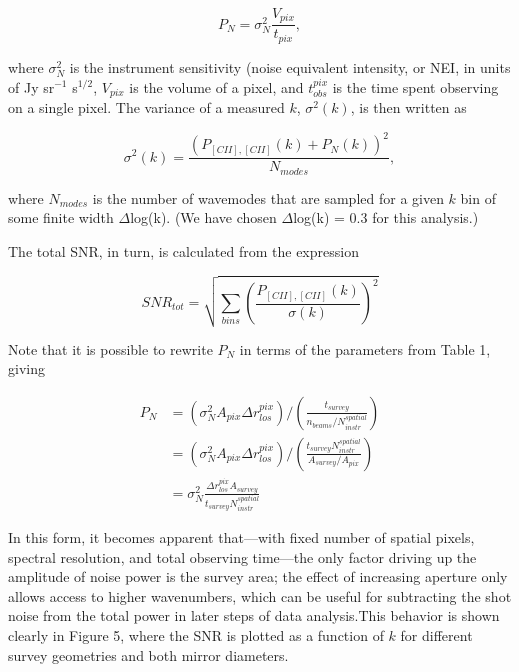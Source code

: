 \documentclass[12pt,preprint]{emulateapj}
\begin{document}
\begin{equation}
P_N = \sigma_N^2 \frac{V_{pix}}{t_{pix}},
\end{equation}

where $\sigma_N^2$ is the instrument sensitivity (noise equivalent intensity, or NEI, in units of Jy sr$^{-1}$ s$^{1/2}$, $V_{pix}$ is the volume of a pixel, and $t_{obs}^{pix}$ is the time spent observing on a single pixel. The variance of a measured $k$, $\sigma^2(k)$, is then written as

\begin{equation}
\sigma^2(k) = \frac{\left({P_{[CII],[CII]}(k) + P_N(k)}\right)^{2}}{N_{modes}},
\end{equation}

where $N_{modes}$ is the number of wavemodes that are sampled for a given $k$ bin of some finite width $\Delta$log(k). (We have chosen $\Delta$log(k) = 0.3 for this analysis.)

The total SNR, in turn, is calculated from the expression 

\begin{equation}
SNR_{tot} = \sqrt{\sum_{bins} \left(\frac{P_{[CII],[CII]}(k)}{\sigma(k)}\right)^2}
\end{equation}

Note that it is possible to rewrite $P_N$ in terms of the parameters from Table 1, giving 

\begin{equation}
\begin{split}
P_N& = \left(\sigma_N^2 A_{pix} \Delta r_{los}^{pix}\right) / \left({\frac{t_{survey}}{n_{beams}/N_{instr}^{spatial}}}\right) \\
& = \left(\sigma_N^2 A_{pix}\Delta r_{los}^{pix}\right) /  \left(\frac{t_{survey} N_{instr}^{spatial}}{A_{survey}/A_{pix}}\right)\\
& = \sigma_N^2 \frac{\Delta r_{los}^{pix} A_{survey}}{t_{survey} N_{instr}^{spatial}}
\end{split}
\label{eq:pnoise}
\end{equation}

In this form, it becomes apparent that---with fixed number of spatial pixels, spectral resolution, and total observing time---the only factor driving up the amplitude of noise power is the survey area; the effect of increasing aperture only allows access to higher wavenumbers, which can be useful for subtracting the shot noise from the total power in later steps of data analysis.This behavior is shown clearly in Figure 5, where the SNR is plotted as a function of $k$ for different survey geometries and both mirror diameters.
\end{document}
